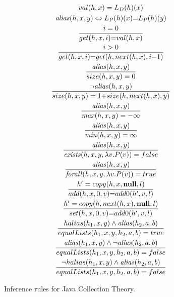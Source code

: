 \documentclass[runningheads,a4paper]{llncs}
\begin{document}
\setlength{\jot}{1em}
\begin{figure*}
\begin{framed}
\begin{gather}
val(h,x) = L_D(h)(x)\\
\mathit{alias}(h,x,y) \Leftrightarrow L_P(h)(x){=}L_P(h)(y)\\
\frac{i=0}{get(h,x,i) {=} val(h,x)}\\
\frac{i>0}{get(h,x,i) {=}  get(h,next(h,x),i{-}1)}\\
\frac{\mathit{alias}(h,x, y)}{size(h,x,y) = 0}\\
\frac{\neg \mathit{alias}(h,x, y)}{size(h,x,y) =  1 {+} size(h,next(h,x),y)}\\
\frac{\mathit{alias}(h,x, y)}{\mathit{max}(h,x,y) = -\infty}\\ 
\frac{\mathit{alias}(h,x, y)}{\mathit{min}(h,x,y) = \infty}\\
\frac{\mathit{alias}(h,x, y)}{\mathit{exists}(h,x,y,\lambda v. P(v)) = false}\\
\frac{\mathit{alias}(h,x, y)}{\mathit{forall}(h,x,y,\lambda v. P(v)) = true}\\
\frac{h'=copy(h,x,\mathbf{null},l)}{add(h,x,0,v) {=} add0(h',v,l)}\\
\frac{h'=copy(h,next(h,x),\mathbf{null},l)}{set(h,x,0,v) {=} add0(h',v,l)}\\
\frac{halias(h_1,x, y) \wedge \mathit{alias}(h_2,a,b)}{equalLists(h_1,x,y,h_2,a,b) =
true}\\
\frac{\mathit{alias}(h_1,x, y) \wedge \neg
\mathit{alias}(h_2,a,b)}{equalLists(h_1,x,y,h_2,a,b) = false}\\
\frac{\neg halias(h_1,x, y) \wedge
\mathit{alias}(h_2,a,b)}{equalLists(h_1,x,y,h_2,a,b) = false}
\end{gather}
\end{framed}
\caption{Inference rules for Java Collection Theory.}
\label{fig:JCT-formal}
\end{figure*}
\end{document}
